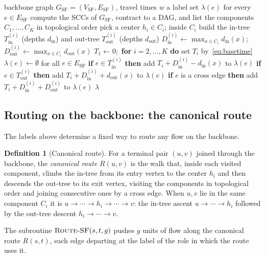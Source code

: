 \documentclass[11pt]{article}
\theoremstyle{definition}
\newtheorem{definition}{Definition}
\theoremstyle{remark}
\newcommand{\ESF}{E_{\mathrm{SF}}}
\newcommand{\GSF}{G_{\mathrm{SF}}}
\newcommand{\VSF}{V_{\mathrm{SF}}}
\newcommand{\Tin}{T^{(i)}_{\mathrm{in}}}
\newcommand{\Tout}{T^{(i)}_{\mathrm{out}}}
\newcommand{\din}{d_{\mathrm{in}}}
\newcommand{\dout}{d_{\mathrm{out}}}
\newcommand{\Din}{D^{(i)}_{\mathrm{in}}}
\newcommand{\Dout}{D^{(i)}_{\mathrm{out}}}
\begin{document}
\begin{algorithm}[H]
\caption{$\textsc{Assign-Labels}(\GSF,w)$}
\label{alg:labels}
\begin{algorithmic}[1]
\Require backbone graph $\GSF=(\VSF,\ESF)$, travel times $w$
\Ensure a label set $\lambda(e)$ for every $e\in\ESF$
\State compute the SCCs of $\GSF$, contract to a DAG, and list the components $C_1,\dots,C_K$ in topological order
  \State pick a center $h_i\in C_i$; inside $C_i$ build the in-tree $\Tin$ (depths $\din$) and out-tree $\Tout$ (depths $\dout$)
  \State $\Din\gets\max_{x\in C_i}\din(x)$;\quad $\Dout\gets\max_{x\in C_i}\dout(x)$
\EndFor
\State $T_1\gets 0$;\ \textbf{for} $i=2,\dots,K$ \textbf{do} set $T_i$ by~\eqref{eq:basetime} 
\State $\lambda(e)\gets\emptyset$ for all $e\in\ESF$
\For{each edge $e=(x,y)\in\ESF$ with $x\in C_i$}
  \State \textbf{if} $e\in\Tin$ \textbf{then} add $T_i+\Din-\din(x)$ to $\lambda(e)$
  \State \textbf{if} $e\in\Tout$ \textbf{then} add $T_i+\Din+\dout(x)$ to $\lambda(e)$
  \State \textbf{if} $e$ is a cross edge \textbf{then} add $T_i+\Din+\Dout$ to $\lambda(e)$
\EndFor
\State \Return $\lambda$
\end{algorithmic}
\end{algorithm}

\subsection{Routing on the backbone: the canonical route}\label{sec:canonical}

The labels above determine a fixed way to route any flow on the backbone.

\begin{definition}[Canonical route]\label{def:canonical}
For a terminal pair $(u,v)$ joined through the backbone, the \emph{canonical route} $R(u,v)$ is the
walk that, inside each visited component, climbs the in-tree from its entry vertex to the center $h_i$
and then descends the out-tree to its exit vertex, visiting the components in topological order and
joining consecutive ones by a cross edge. When $u,v$ lie in the same component $C_i$ it is
$u \to \cdots \to h_i \to \cdots \to v$: the in-tree ascent $u\to\cdots\to h_i$ followed by the
out-tree descent $h_i\to\cdots\to v$.
\end{definition}

\noindent The subroutine $\textsc{Route-SF}(s,t,g)$ pushes $g$ units of flow along the canonical route
$R(s,t)$, each edge departing at the label of the role in which the route uses it.
\end{document}

